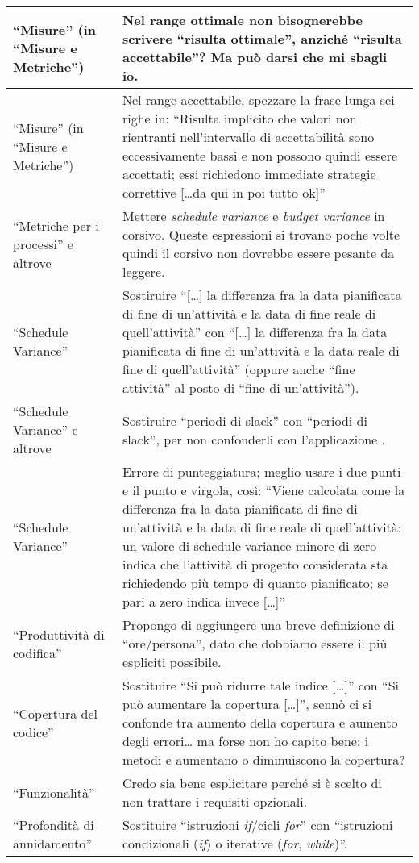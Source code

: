 \documentclass[a4paper]{article}
\begin{document}
\begin{longtable}{| p{3cm} | p{10cm} |}
	“Misure” (in “Misure e Metriche”) & Nel range ottimale non bisognerebbe scrivere “risulta ottimale”, anziché “risulta accettabile”? Ma può darsi che mi sbagli io. \\ \hline
	“Misure” (in “Misure e Metriche”) & Nel range accettabile, spezzare la frase lunga sei righe in: “Risulta implicito che valori non rientranti nell'intervallo di accettabilità sono eccessivamente bassi e non possono quindi essere accettati; essi richiedono immediate strategie correttive [\dots da qui in poi tutto ok]” \\ \hline
	“Metriche per i processi” e altrove & Mettere \emph{schedule variance} e \emph{budget variance} in corsivo. Queste espressioni si trovano poche volte quindi il corsivo non dovrebbe essere pesante da leggere. \\ \hline
	“Schedule Variance” & Sostiruire “[\dots] la differenza fra la data pianificata di fine di un’attività e la data di fine reale di quell'attività” con “[\dots] la differenza fra la data pianificata di fine di un’attività e la data reale di fine di quell'attività” (oppure anche “fine attività” al posto di “fine di un'attività”). \\ \hline
	“Schedule Variance” e altrove & Sostiruire “periodi di slack” con “periodi di slack”, per non confonderli con l'applicazione \gloss{Slack}. \\ \hline
	“Schedule Variance” & Errore di punteggiatura; meglio usare i due punti e il punto e virgola, così: “Viene calcolata come la differenza fra la data pianificata di fine di un'attività e la data di fine reale di quell'attività: un valore di schedule variance minore di zero indica che l'attività di progetto considerata sta richiedendo più tempo di quanto pianificato; se pari a zero indica invece [\dots]” \\ \hline
	“Produttività di codifica” & Propongo di aggiungere una breve definizione di “ore/persona”, dato che dobbiamo essere il più espliciti possibile. \\ \hline
	“Copertura del codice” & Sostituire “Si può ridurre tale indice [\dots]” con “Si può aumentare la copertura [\dots]”, sennò ci si confonde tra aumento della copertura e aumento degli errori\dots{} ma forse non ho capito bene: i metodi \emph{\gloss{getter}} e \emph{\gloss{setter}} aumentano o diminuiscono la copertura? \\ \hline
	“Funzionalità” & Credo sia bene esplicitare perché si è scelto di non trattare i requisiti opzionali. \\ \hline
	“Profondità di annidamento” & Sostituire “istruzioni \emph{if}/cicli \emph{for}” con “istruzioni condizionali (\emph{if}) o iterative (\emph{for}, \emph{while})”. \\ \hline

\end{longtable}
\end{document}
